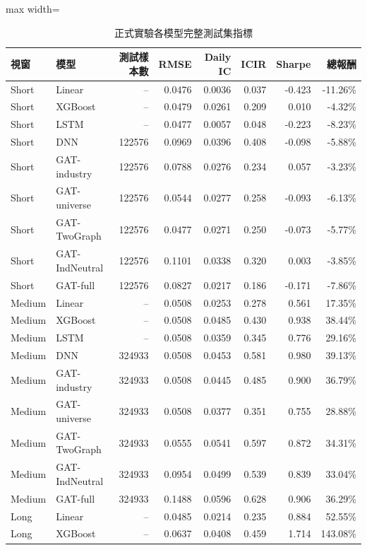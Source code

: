 \begin{table}[H]
\centering
\caption{正式實驗各模型完整測試集指標}
\label{tab:appendix_pred_detail}
\scriptsize
\begin{adjustbox}{max width=\textwidth}
\begin{tabular}{llrrrrrr}
\toprule
視窗 & 模型 & 測試樣本數 & RMSE & Daily IC & ICIR & Sharpe & 總報酬 \\
\midrule
Short & Linear & -- & 0.0476 & 0.0036 & 0.037 & -0.423 & -11.26\% \\
Short & XGBoost & -- & 0.0479 & 0.0261 & 0.209 & 0.010 & -4.32\% \\
Short & LSTM & -- & 0.0477 & 0.0057 & 0.048 & -0.223 & -8.23\% \\
Short & DNN & 122576 & 0.0969 & 0.0396 & 0.408 & -0.098 & -5.88\% \\
Short & GAT-industry & 122576 & 0.0788 & 0.0276 & 0.234 & 0.057 & -3.23\% \\
Short & GAT-universe & 122576 & 0.0544 & 0.0277 & 0.258 & -0.093 & -6.13\% \\
Short & GAT-TwoGraph & 122576 & 0.0477 & 0.0271 & 0.250 & -0.073 & -5.77\% \\
Short & GAT-IndNeutral & 122576 & 0.1101 & 0.0338 & 0.320 & 0.003 & -3.85\% \\
Short & GAT-full & 122576 & 0.0827 & 0.0217 & 0.186 & -0.171 & -7.86\% \\
\midrule
Medium & Linear & -- & 0.0508 & 0.0253 & 0.278 & 0.561 & 17.35\% \\
Medium & XGBoost & -- & 0.0508 & 0.0485 & 0.430 & 0.938 & 38.44\% \\
Medium & LSTM & -- & 0.0508 & 0.0359 & 0.345 & 0.776 & 29.16\% \\
Medium & DNN & 324933 & 0.0508 & 0.0453 & 0.581 & 0.980 & 39.13\% \\
Medium & GAT-industry & 324933 & 0.0508 & 0.0445 & 0.485 & 0.900 & 36.79\% \\
Medium & GAT-universe & 324933 & 0.0508 & 0.0377 & 0.351 & 0.755 & 28.88\% \\
Medium & GAT-TwoGraph & 324933 & 0.0555 & 0.0541 & 0.597 & 0.872 & 34.31\% \\
Medium & GAT-IndNeutral & 324933 & 0.0954 & 0.0499 & 0.539 & 0.839 & 33.04\% \\
Medium & GAT-full & 324933 & 0.1488 & 0.0596 & 0.628 & 0.906 & 36.29\% \\
\midrule
Long & Linear & -- & 0.0485 & 0.0214 & 0.235 & 0.884 & 52.55\% \\
Long & XGBoost & -- & 0.0637 & 0.0408 & 0.459 & 1.714 & 143.08\% \\

\end{tabular}
\end{adjustbox}
\end{table}
